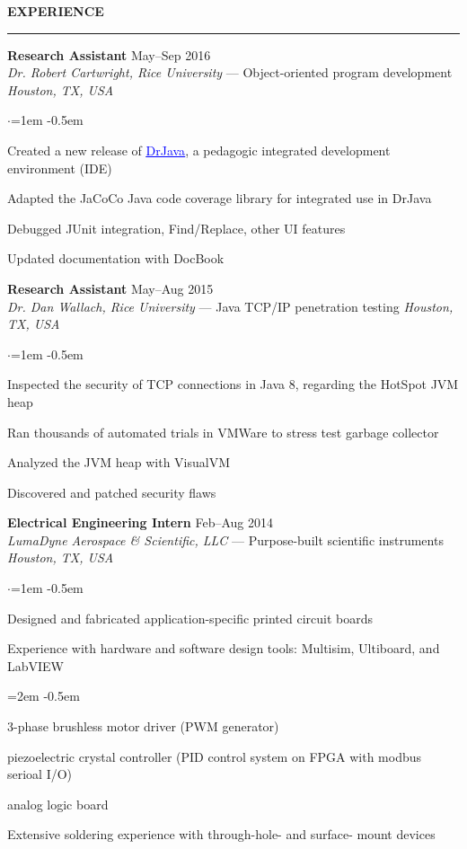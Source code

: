 \documentclass[10pt, a4paper]{article}
\newenvironment{aSection}[1]{
    \medskip \textbf{\uppercase{#1}}
    \smallskip
    \hrule
    \begin{list}{}{
            \setlength{\leftmargin}{1.5em}
        }
    \item[]
    }{
    \end{list}
}
\newenvironment{expSubsection}[4]{
    \textbf{#3} \hfill {#2} \\
    {#1} \hfill \textit{#4}
    \smallskip
    \begin{list}{$\cdot$}{\leftmargin=1em}
    \itemsep -0.5em \vspace{-0.5em}
    }{
    \end{list}
    \vspace{0.5em}
}
\newenvironment{subList}{
    \begin{list}{\raisebox{.4ex}{\tiny$\succ$}}{\leftmargin=2em}
    \itemsep -0.5em \vspace{-0.5em}
    }{
    \end{list}
}
\begin{document}
\begin{aSection}{Experience}
    \begin{expSubsection}
        {\textit{Dr. Robert Cartwright, Rice University} --- Object-oriented program development}
        {May--Sep 2016}
        {Research Assistant}
        {Houston, TX, USA}
    \item Created a new release of
        \href{http://www.drjava.org}{\textcolor{blue}{\underline{DrJava}}}, a pedagogic integrated
        development environment (IDE)
    \item Adapted the JaCoCo Java code coverage library for integrated use in DrJava
    \item Debugged JUnit integration, Find/Replace, other UI features
    \item Updated documentation with DocBook
    \end{expSubsection}

    \begin{expSubsection}
        {\textit{Dr. Dan Wallach, Rice University} --- Java TCP/IP penetration testing}
        {May--Aug 2015}
        {Research Assistant}
        {Houston, TX, USA}
    \item Inspected the security of TCP connections in Java 8, regarding the HotSpot JVM heap
    \item Ran thousands of automated trials in VMWare to stress test garbage collector
    \item Analyzed the JVM heap with VisualVM
    \item Discovered and patched security flaws
    \end{expSubsection}

    \begin{expSubsection}
        {\textit{LumaDyne Aerospace \& Scientific, LLC} --- Purpose-built scientific
        instruments}
        {Feb--Aug 2014}
        {Electrical Engineering Intern}
        {Houston, TX, USA}
    \item Designed and fabricated application-specific printed circuit boards
    \item Experience with hardware and software design tools: Multisim, Ultiboard, and LabVIEW
        \begin{subList}
            \item 3-phase brushless motor driver (PWM generator)
            \item piezoelectric crystal controller (PID control system on FPGA
                with modbus serioal I/O)
            \item analog logic board
        \end{subList}
    \item Extensive soldering experience with through-hole- and surface-
        mount devices
    \end{expSubsection}


\end{aSection}
\end{document}
